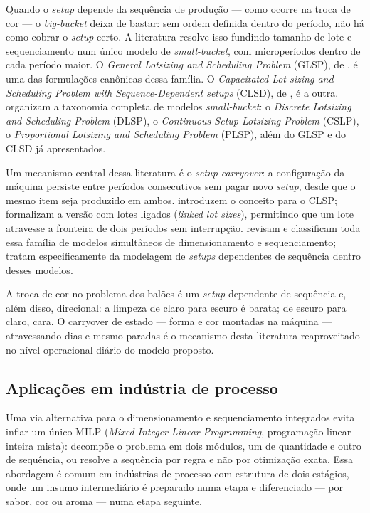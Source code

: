 \documentclass[fleqn,12pt,a4paper]{article}
\begin{document}
Quando o \textit{setup} depende da sequência de produção --- como ocorre na troca de cor --- o \textit{big-bucket} deixa de bastar: sem ordem definida dentro do período, não há como cobrar o \textit{setup} certo. A literatura resolve isso fundindo tamanho de lote e sequenciamento num único modelo de \textit{small-bucket}, com microperíodos dentro de cada período maior. O \textit{General Lotsizing and Scheduling Problem} (GLSP), de , é uma das formulações canônicas dessa família. O \textit{Capacitated Lot-sizing and Scheduling Problem with Sequence-Dependent setups} (CLSD), de , é a outra.  organizam a taxonomia completa de modelos \textit{small-bucket}: o \textit{Discrete Lotsizing and Scheduling Problem} (DLSP), o \textit{Continuous Setup Lotsizing Problem} (CSLP), o \textit{Proportional Lotsizing and Scheduling Problem} (PLSP), além do GLSP e do CLSD já apresentados.

Um mecanismo central dessa literatura é o \textit{setup carryover}: a configuração da máquina persiste entre períodos consecutivos sem pagar novo \textit{setup}, desde que o mesmo item seja produzido em ambos.  introduzem o conceito para o CLSP;  formalizam a versão com lotes ligados (\textit{linked lot sizes}), permitindo que um lote atravesse a fronteira de dois períodos sem interrupção.  revisam e classificam toda essa família de modelos simultâneos de dimensionamento e sequenciamento;  tratam especificamente da modelagem de \textit{setups} dependentes de sequência dentro desses modelos.

A troca de cor no problema dos balões é um \textit{setup} dependente de sequência e, além disso, direcional: a limpeza de claro para escuro é barata; de escuro para claro, cara. O carryover de estado --- forma e cor montadas na máquina --- atravessando dias e mesmo paradas é o mecanismo desta literatura reaproveitado no nível operacional diário do modelo proposto.

\subsection{Aplicações em indústria de processo}

Uma via alternativa para o dimensionamento e sequenciamento integrados evita inflar um único MILP (\textit{Mixed-Integer Linear Programming}, programação linear inteira mista): decompõe o problema em dois módulos, um de quantidade e outro de sequência, ou resolve a sequência por regra e não por otimização exata. Essa abordagem é comum em indústrias de processo com estrutura de dois estágios, onde um insumo intermediário é preparado numa etapa e diferenciado --- por sabor, cor ou aroma --- numa etapa seguinte.
\end{document}
